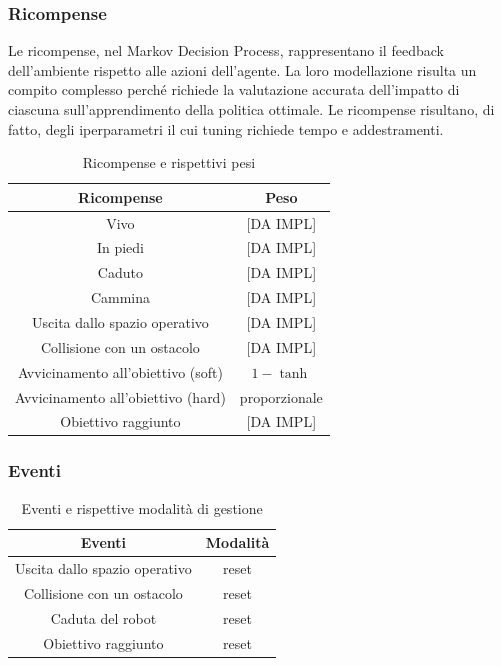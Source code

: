 
\subsubsection{Ricompense}
Le ricompense, nel Markov Decision Process, rappresentano il feedback dell'ambiente rispetto alle azioni dell'agente. La loro modellazione risulta un compito complesso perché richiede la valutazione accurata dell'impatto di ciascuna sull'apprendimento della politica ottimale. Le ricompense risultano, di fatto, degli iperparametri il cui tuning richiede tempo e addestramenti. 


\begin{table}[h]
    \centering
    \begin{tabular}{|c|c|}
    \hline
    \textbf{Ricompense} & \textbf{Peso} \\ \hline
    Vivo & [DA IMPL] \\ \hline
    In piedi & [DA IMPL] \\ \hline
    Caduto & [DA IMPL] \\ \hline
    Cammina & [DA IMPL] \\ \hline
    Uscita dallo spazio operativo & [DA IMPL] \\ \hline
    Collisione con un ostacolo & [DA IMPL] \\ \hline
    Avvicinamento all'obiettivo (soft) & $1-\tanh$ \\ \hline
    Avvicinamento all'obiettivo (hard) & proporzionale \\ \hline
    Obiettivo raggiunto & [DA IMPL] \\ \hline
    \end{tabular}
    \caption{Ricompense e rispettivi pesi}
    \label{tab:rew}
\end{table}


\subsubsection{Eventi}

\begin{table}[h]
    \centering
    \begin{tabular}{|c|c|}
    \hline
    \textbf{Eventi} & \textbf{Modalità} \\ \hline
    Uscita dallo spazio operativo & reset \\ \hline
    Collisione con un ostacolo & reset \\ \hline
    Caduta del robot & reset \\ \hline
    Obiettivo raggiunto & reset \\ \hline
    \end{tabular}
    \caption{Eventi e rispettive modalità di gestione}
    \label{tab:ev}
\end{table}


